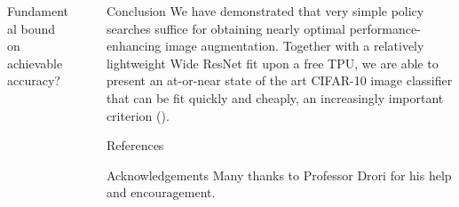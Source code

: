 \documentclass[final]{beamer}
\newlength{\sepwid}
\newlength{\onecolwid}
\begin{document}
\begin{frame}[t]
\begin{columns}[t]
\begin{column}{\onecolwid}
\begin{block}{Fundamental bound on achievable accuracy?}
\begin{figure}
\centering
\includegraphics[width=0.70\linewidth]{catfrog.png}
\end{figure}


\end{block}



\end{column} %

\begin{column}{\sepwid}\end{column} %
\begin{column}{\onecolwid} %

\begin{block}{Conclusion}
We have demonstrated that very simple policy searches suffice for obtaining nearly optimal performance-enhancing image augmentation. Together with a relatively lightweight Wide ResNet fit upon a free TPU, we are able to present an at-or-near state of the art CIFAR-10 image classifier that can be fit quickly and cheaply, an increasingly important criterion (\cite{Coleman2017}).
\end{block}

\begin{block}{References}
{\small


}
\end{block}

\begin{block}{Acknowledgements}
Many thanks to Professor Drori for his help and encouragement. \\
\end{block}


\end{column}
\end{columns}
\end{frame}
\end{document}
